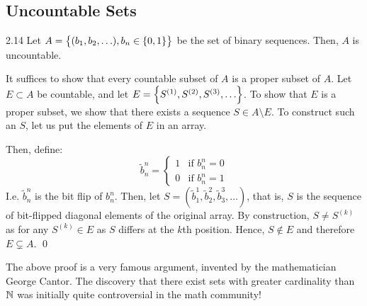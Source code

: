 \subsection{Uncountable Sets}
\begin{theorem}{}{2.14}
Let $A = \set{(b_1, b_2, \ldots), b_n \in \set{0, 1}}$ be the set of binary sequences. Then, $A$ is uncountable. 
\end{theorem}
\begin{nproof}
    It suffices to show that every countable subset of $A$ is a proper subset of $A$. Let $E \subset A$ be countable, and let $E = \set{S^{(1)}, S^{(2)}, S^{(3)}, \ldots}$. To show that $E$ is a proper subset, we show that there exists a sequence $S \in A \setminus E$. To construct such an $S$, let us put the elements of $E$ in an array. 
    \begin{center}
    \end{center}
    Then, define:
    \[\tilde{b}_n^n = \begin{cases}
        1 & \text{if $b_n^n = 0$}
        \\ 0 & \text{if $b_n^n = 1$}
    \end{cases}\]
    I.e. $\tilde{b}_n^n$ is the bit flip of $b_n^n$. Then, let $S = (\tilde{b}_1^1, \tilde{b}_2^2, \tilde{b}_3^3, \ldots)$, that is, $S$ is the sequence of bit-flipped diagonal elements of the original array. By construction, $S \neq S^{(k)}$ as for any $S^{(k)} \in E$ as $S$ differs at the $k$th position. Hence, $S \notin E$ and therefore $E \subsetneq A$. \qed
\end{nproof}
\noindent The above proof is a very famous argument, invented by the mathematician George Cantor. The discovery that there exist sets with greater cardinality than $\mathbb{N}$ was initially quite controversial in the math community!

